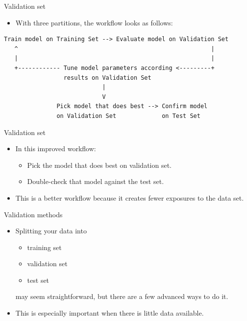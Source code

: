 \documentclass{beamer}
\begin{document}

\begin{frame}[fragile]{Validation set}
\begin{itemize}
\item With three partitions, the workflow looks as follows:
\end{itemize}

\medskip
{\footnotesize
\begin{verbatim}
Train model on Training Set --> Evaluate model on Validation Set
   ^                                                       |
   |                                                       |   
   +------------ Tune model parameters according <---------+ 
                 results on Validation Set
                            |
                            V
               Pick model that does best --> Confirm model 
               on Validation Set             on Test Set
\end{verbatim}
}

\end{frame}


\begin{frame}[fragile]{Validation set}
\begin{itemize}
\item In this improved workflow:

\medskip
\begin{itemize}
\item Pick the model that does best on validation set.

\medskip
\item Double-check that model against the test set.
\end{itemize}

\medskip
\item This is a better workflow because it creates fewer exposures to the data set.
\end{itemize}
\end{frame}


\begin{frame}{Validation methods}
\begin{itemize}
\item Splitting your data into

\medskip
\begin{itemize}
\item training set

\medskip
\item validation set

\medskip
\item test set
\end{itemize}

\medskip
may seem straightforward, but there are a few advanced ways to do it. 

\medskip
\item This is especially important when there is little data available.
\end{itemize}
\end{frame}
\end{document}
